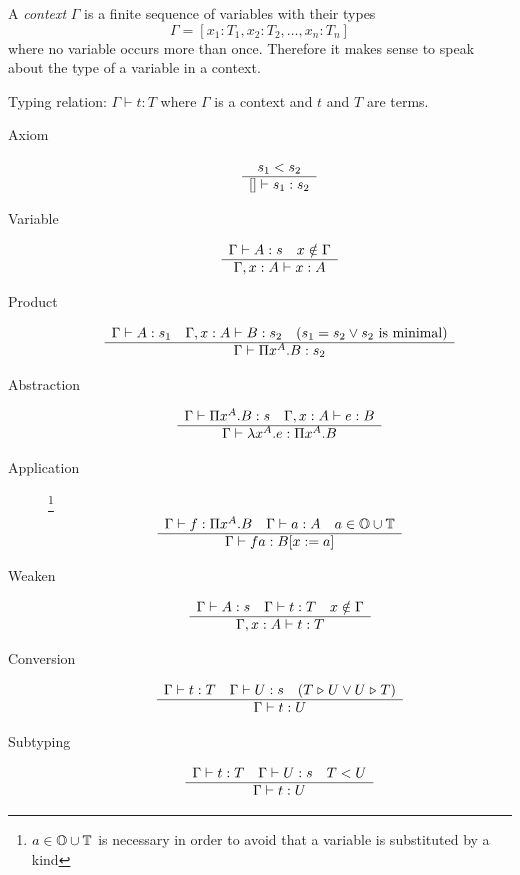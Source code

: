\begin{definition}
  A \emph{context} $\Gamma$ is a finite sequence of variables with their types
  $$
  \Gamma = [x_1: T_1, x_2: T_2, \ldots , x_n: T_n]
  $$
  where no variable occurs more than once. Therefore it makes sense to speak
  about the type of a variable in a context.
\end{definition}

\begin{definition}
  Typing relation: $\Gamma \vdash t: T$ where $\Gamma$ is a context and $t$
  and $T$ are terms.
  \begin{description}

  \item[Axiom] $$\begin{array}{c} s_1 < s_2 \\ \hline [] \vdash s_1:s_2\end{array}$$

  \item[Variable]
    $$\begin{array}{c} \Gamma \vdash A:s\quad x \notin \Gamma \\ \hline \Gamma,x:A \vdash x:A\end{array}$$


  \item[Product]
    $$\begin{array}{c} \Gamma \vdash A:s_1 \quad
      \Gamma,x:A \vdash B:s_2 \quad
      (s_1 = s_2 \lor s_2 \text{ is minimal})  \\ \hline \Gamma \vdash \Pi x^A . B : s_2\end{array}
    $$

  \item[Abstraction]
    $$\begin{array}{c} \Gamma \vdash \Pi x^A.B: s \quad
      \Gamma,x:A \vdash e:B
     \\ \hline \Gamma \vdash \lambda x^A.e : \Pi x^A . B\end{array}
    $$

  \item[Application]
    \footnote{$a \in \mathbb{O} \cup \mathbb{T}$ is necessary in order to avoid that
      a variable is substituted by a kind}
   $$\begin{array}{c} \Gamma \vdash f: \Pi x^A.B \quad
      \Gamma \vdash a:A
      \quad a \in \mathbb{O} \cup \mathbb{T}
     \\ \hline \Gamma \vdash f a : B[x:=a]\end{array}
    $$

  \item[Weaken]
    $$\begin{array}{c} \Gamma \vdash A:s \quad  \Gamma \vdash t:T   \quad x \notin \Gamma \\ \hline \Gamma,x:A \vdash t:T\end{array}$$


  \item[Conversion]
    $$\begin{array}{c} \Gamma \vdash t: T \quad
      \Gamma\vdash U: s \quad
      (T \mathrel{\triangleright} U \lor U \mathrel{\triangleright} T)
     \\ \hline \Gamma \vdash t: U\end{array}
    $$

  \item[Subtyping]
    $$\begin{array}{c} \Gamma \vdash t: T \quad
      \Gamma\vdash U: s \quad
      T < U
     \\ \hline \Gamma \vdash t: U\end{array}
    $$
  \end{description}
\end{definition}

